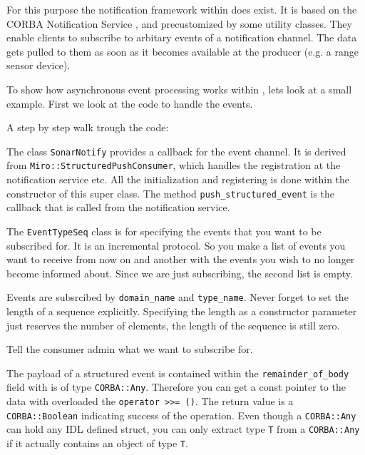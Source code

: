 For this purpose the notification framework within \miro does
exist. It is based on the CORBA Notification Service \cite{OMG:00-5},
and precustomized by some utility classes. They enable clients to
subscribe to arbitary events of a notification channel. The data gets
pulled to them as soon as it becomes available at the producer (e.g. a
range sensor device).

To show how asynchronous event processing works within \miro, lets
look at a small example. First we look at the code to handle the
events.



A step by step walk trough the code:



The class \lstinline!SonarNotify! provides a callback for the event
channel. It is derived from \lstinline!Miro::StructuredPushConsumer!,
which handles the registration at the notification service etc. All
the initialization and registering is done within the constructor of
this super class. The method \lstinline!push_structured_event! is the
callback that is called from the notification service.



The \lstinline!EventTypeSeq! class is for specifying the events that you
want to be subscribed for. It is an incremental protocol. So you make
a list of events you want to receive from now on and another with the
events you wish to no longer become informed about. Since we are just
subscribing, the second list is empty.



Events are subsrcibed by \lstinline!domain_name! and
\lstinline!type_name!. Never forget to set the length of a sequence
explicitly. Specifying the length as a constructor parameter just
reserves the number of elements, the length of the sequence is still
zero.



Tell the consumer admin what we want to subscribe for.



The payload of a structured event is contained within the
\lstinline!remainder_of_body! field with is of type
\lstinline!CORBA::Any!.  Therefore you can get a const pointer to the
data with overloaded the \lstinline!operator >>= ()!. The return value
is a \lstinline!CORBA::Boolean! indicating success of the operation.
Even though a \lstinline!CORBA::Any! can hold any IDL defined struct,
you can only extract type \lstinline!T! from a \lstinline!CORBA::Any!
if it actually contains an object of type \lstinline!T!.

